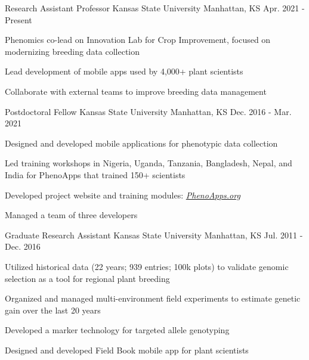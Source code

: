 
\begin{cventries}

  \cventry
    {Research Assistant Professor} %
    {Kansas State University} %
    {Manhattan, KS} %
    {Apr. 2021 - Present} %
    {
      \begin{cvitems} %
        \item {Phenomics co-lead on Innovation Lab for Crop Improvement, focused on modernizing breeding data collection}
        \item {Lead development of mobile apps used by 4,000+ plant scientists}
        \item {Collaborate with external teams to improve breeding data management}
      \end{cvitems}
    }

  \cventry
    {Postdoctoral Fellow} %
    {Kansas State University} %
    {Manhattan, KS} %
    {Dec. 2016 - Mar. 2021} %
    {
      \begin{cvitems} %
        \item {Designed and developed mobile applications for phenotypic data collection}
        \item {Led training workshops in Nigeria, Uganda, Tanzania, Bangladesh, Nepal, and India for PhenoApps that trained 150+ scientists}
        \item {Developed project website and training modules: \href{www.PhenoApps.org}{\textit{PhenoApps.org}}}
        \item {Managed a team of three developers}
      \end{cvitems}
    }

  \cventry
    {Graduate Research Assistant} %
    {Kansas State University} %
    {Manhattan, KS} %
    {Jul. 2011 - Dec. 2016} %
    {
      \begin{cvitems} %
        \item {Utilized historical data (22 years; 939 entries; 100k plots) to validate genomic selection as a  tool for regional plant breeding}
        \item {Organized and managed multi-environment field experiments to estimate genetic gain over the last 20 years}
        \item {Developed a marker technology for targeted allele genotyping}
        \item {Designed and developed Field Book mobile app for plant scientists}
      \end{cvitems}
    }


\end{cventries}
